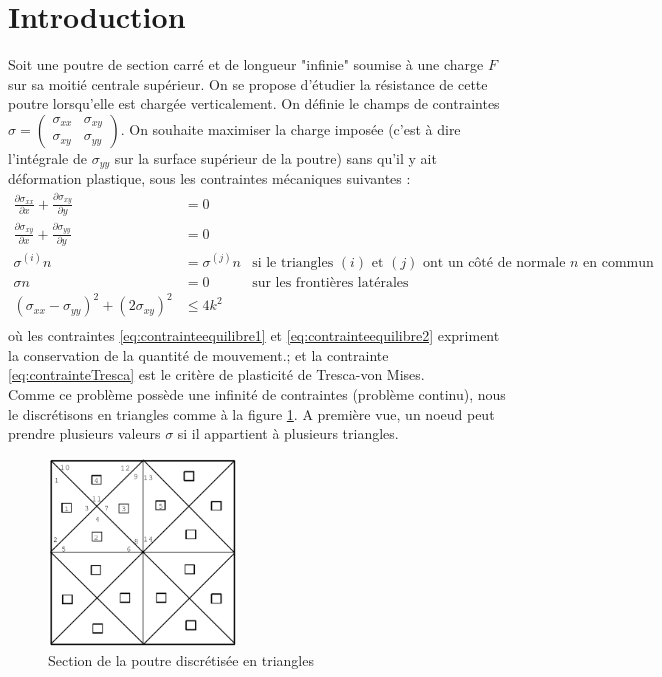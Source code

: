 \section*{Introduction}
Soit une poutre de section carré et de longueur "infinie" soumise à une charge $F$ sur sa moitié centrale supérieur. On se propose d'étudier la résistance de cette poutre lorsqu'elle est chargée verticalement. On définie le champs de contraintes $\sigma = \begin{pmatrix}
\sigma_{xx} & \sigma_{xy}\\
\sigma_{xy} & \sigma_{yy}
\end{pmatrix}$. On souhaite maximiser la charge imposée (c'est à dire l'intégrale de $\sigma_{yy}$ sur la surface supérieur de la poutre) sans qu'il y ait déformation plastique, sous les contraintes mécaniques suivantes : 
\begin{align}
\frac{\partial \sigma_{xx}}{\partial x} + \frac{\partial \sigma_{xy}}{\partial y} &= 0 \label{eq:contrainteequilibre1}\\
\frac{\partial \sigma_{xy}}{\partial x} + \frac{\partial \sigma_{yy}}{\partial y} &= 0\label{eq:contrainteequilibre2}\\
\sigma^{(i)}n &= \sigma^{(j)}n & \text{si le triangles $(i)$ et $(j)$ ont un côté de normale $n$ en commun} \label{eq:contrainteContinuite}\\
\sigma n &= 0 & \text{sur les frontières latérales} \label{eq:contrainteFrontiere} \\
(\sigma_{xx} - \sigma_{yy})^2 + (2 \sigma_{xy})^2 & \leq 4 k^2 \label{eq:contrainteTresca}\\
\end{align}
où les contraintes \eqref{eq:contrainteequilibre1} et \eqref{eq:contrainteequilibre2} expriment la conservation de la quantité de mouvement.; et la contrainte \eqref{eq:contrainteTresca} est le critère de plasticité de Tresca-von Mises. \\
Comme ce problème possède une infinité de contraintes (problème continu), nous le discrétisons en triangles comme à la figure \ref{fig:discretisation}. A première vue, un noeud peut prendre plusieurs valeurs $\sigma$ si il appartient à plusieurs triangles. 

\begin{figure}
\centering
\includegraphics[height=5cm]{images/discretisation.png}
\caption{Section de la poutre discrétisée en triangles}
\label{fig:discretisation}
\end{figure}


